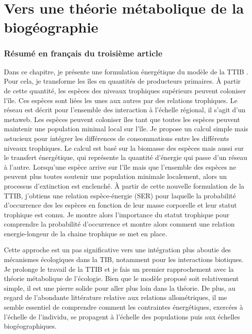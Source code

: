 \chapter{Vers une théorie métabolique de la biogéographie}
\label{chap4}


\subsection{Résumé en français du troisième article}

Dans ce chapitre, je présente une formulation énergétique du modèle
de la TTIB \citep{Gravel2011}. Pour cela, je transforme les îles en
quantités de producteurs primaires. À partir de cette quantité,
les espèces des niveaux trophiques supérieurs peuvent coloniser l'île.
Ces espèces sont liées les unes aux autres par des relations trophiques.
Le réseau est décrit pour l'ensemble des interaction à l'échelle régional,
il s'agit d'un metaweb. Les espèces peuvent coloniser îles tant que toutes les
espèces peuvent maintenir une population minimal local sur l'île.
Je propose un calcul simple mais astucieux pour intégrer les différences
de consommations entre les différents niveaux trophiques. Le calcul est
basé sur la biomasse des espèces mais aussi sur le transfert énergétique,
qui représente la quantité d'énergie qui passe d'un réseau à l'autre.
Lorsqu'une espèce arrive sur l'île mais que l'ensemble des espèces ne peuvent
plus toutes soutenir une population minimale localement, alors un processus
d'extinction est enclenché. À partir de cette nouvelle formulation de la
TTIB, j'obtiens une relation espèce-énergie (SER) pour laquelle la probabilité
d'occurrence des les espèces en fonction de leur masse corporelle et
leur statut trophique est connu. Je montre alors l'importance du statut trophique
pour comprendre la probabilité d'occurrence et montre alors comment une relation
energie-longeur de la chaine trophique se met en place.

Cette approche est un pas significative vers une intégration plus aboutie des
mécanismes écologiques dans la TIB, notamment pour les
interactions biotiques. Je prolonge le travail de la TTIB et
je fais un premier rapprochement avec la théorie métabolique de l'écologie.
Bien que le modèle proposé soit relativement simple, il est une pierre solide pour
aller plus loin dans la théorie. De plus, au regard de l'abondante littérature
relative aux relations allométriques, il me semble essentiel de comprendre
comment les contraintes énergétiques, exercées à l'échelle de l'individu,
se propagent à l’échelle des populations puis aux échelles biogéographiques.



